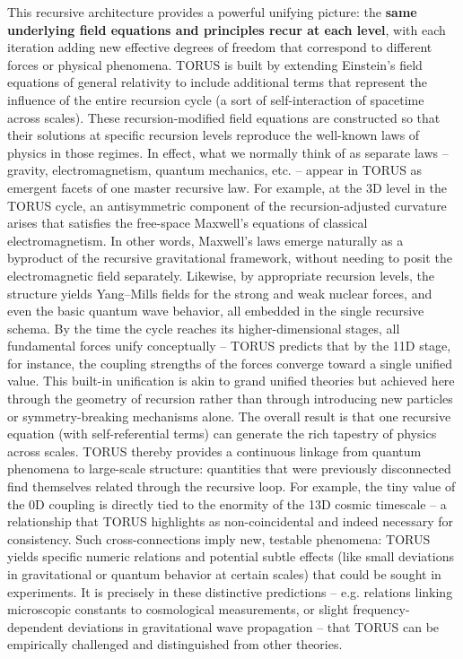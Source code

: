 \documentclass[
]{article}
\begin{document}
This recursive architecture provides a powerful unifying picture: the
\textbf{same underlying field equations and principles recur at each
level}, with each iteration adding new effective degrees of freedom that
correspond to different forces or physical phenomena. TORUS is built by
extending Einstein's field equations of general relativity to include
additional terms that represent the influence of the entire recursion
cycle (a sort of self-interaction of spacetime across scales). These
recursion-modified field equations are constructed so that their
solutions at specific recursion levels reproduce the well-known laws of
physics in those regimes. In effect, what we normally think of as
separate laws -- gravity, electromagnetism, quantum mechanics, etc. --
appear in TORUS as emergent facets of one master recursive law. For
example, at the 3D level in the TORUS cycle, an antisymmetric component
of the recursion-adjusted curvature arises that satisfies the free-space
Maxwell's equations of classical electromagnetism. In other words,
Maxwell's laws emerge naturally as a byproduct of the recursive
gravitational framework, without needing to posit the electromagnetic
field separately. Likewise, by appropriate recursion levels, the
structure yields Yang--Mills fields for the strong and weak nuclear
forces, and even the basic quantum wave behavior, all embedded in the
single recursive schema. By the time the cycle reaches its
higher-dimensional stages, all fundamental forces unify conceptually --
TORUS predicts that by the 11D stage, for instance, the coupling
strengths of the forces converge toward a single unified value. This
built-in unification is akin to grand unified theories but achieved here
through the geometry of recursion rather than through introducing new
particles or symmetry-breaking mechanisms alone. The overall result is
that one recursive equation (with self-referential terms) can generate
the rich tapestry of physics across scales. TORUS thereby provides a
continuous linkage from quantum phenomena to large-scale structure:
quantities that were previously disconnected find themselves related
through the recursive loop. For example, the tiny value of the 0D
coupling \alpha is directly tied to the enormity of the 13D cosmic timescale
-- a relationship that TORUS highlights as non-coincidental and indeed
necessary for consistency. Such cross-connections imply new, testable
phenomena: TORUS yields specific numeric relations and potential subtle
effects (like small deviations in gravitational or quantum behavior at
certain scales) that could be sought in experiments. It is precisely in
these distinctive predictions -- e.g. relations linking microscopic
constants to cosmological measurements, or slight frequency-dependent
deviations in gravitational wave propagation -- that TORUS can be
empirically challenged and distinguished from other theories.
\end{document}
